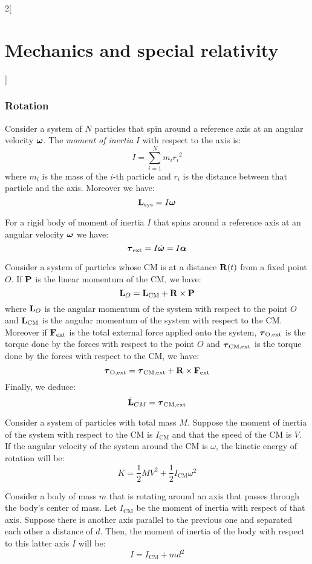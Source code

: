 \documentclass[../../../main.tex]{subfiles}
\begin{document}
\begin{multicols}{2}[\section{Mechanics and special relativity}]
  \subsubsection*{Rotation}
  \begin{definition}
    Consider a system of $N$ particles that spin around a reference axis at an angular velocity $\vb*{\omega}$. The \textit{moment of inertia} $I$ with respect to the axis is: $$I=\sum_{i=1}^Nm_i{r_i}^2$$
    where $m_i$ is the mass of the $i$-th particle and $r_i$ is the distance between that particle and the axis. Moreover we have: $$\vb{L}_\text{sys}=I\vb*{\omega}$$
  \end{definition}
  \begin{prop}
    For a rigid body of moment of inertia $I$ that spins around a reference axis at an angular velocity $\vb*{\omega}$ we have: $$\vb*{\tau}_\text{ext}=I\dot{\vb*{\omega}}=I\vb*{\alpha}$$
  \end{prop}
  \begin{prop}
    Consider a system of particles whose CM is at a distance $\vb{R}(t)$ from a fixed point $O$. If $\vb{P}$ is the linear momentum of the CM, we have: $$\vb{L}_O=\vb{L}_\text{CM}+\vb{R}\times\vb{P}$$ where $\vb{L}_O$ is the angular momentum of the system with respect to the point $O$ and $\vb{L}_\text{CM}$ is the angular momentum of the system with respect to the CM. Moreover if $\vb{F}_\text{ext}$ is the total external force applied onto the system, $\vb*{\tau}_\text{O,ext}$ is the torque done by the forces with respect to the point $O$ and $\vb*{\tau}_\text{CM,ext}$ is the torque done by the forces with respect to the CM, we have: $$\vb*{\tau}_\text{O,ext}=\vb*{\tau}_\text{CM,ext}+\vb{R}\times\vb{F}_\text{ext}$$ Finally, we deduce: $$\dot{\vb{L}}_{CM}=\vb*{\tau}_\text{CM,ext}$$
  \end{prop}
  \begin{prop}
    Consider a system of particles with total mass $M$. Suppose the moment of inertia of the system with respect to the CM is $I_\text{CM}$ and that the speed of the CM is $V$. If the angular velocity of the system around the CM is $\omega$, the kinetic energy of rotation will be: $$K=\frac{1}{2}MV^2+\frac{1}{2}I_\text{CM}\omega^2$$
  \end{prop}
  \begin{theorem}
    Consider a body of mass $m$ that is rotating around an axis that passes through the body's center of mass. Let $I_\text{CM}$ be the moment of inertia with respect of that axis. Suppose there is another axis parallel to the previous one and separated each other a distance of $d$. Then, the moment of inertia of the body with respect to this latter axis $I$ will be:
    $$I=I_\text{CM}+md^2$$
  \end{theorem}

\end{multicols}
\end{document}
